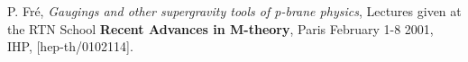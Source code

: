 \documentclass[a4paper,11pt]{article}
\begin{document}
\begin{thebibliography}{99}
%
%
P. Fr\'e, \emph{ Gaugings and other supergravity tools of p-brane physics},
 Lectures given at the RTN School {\bf Recent Advances in M-theory}, Paris February 1-8 2001, IHP, [hep-th/0102114].
%
\end{thebibliography}
\end{document}
